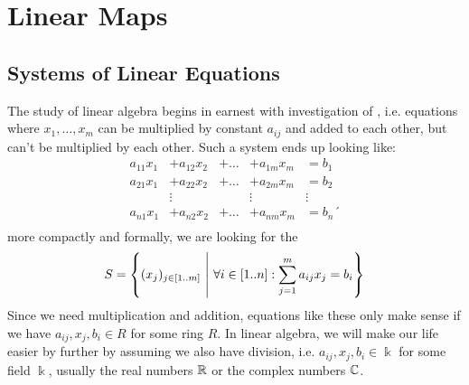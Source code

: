 \chapter{Linear Maps}
\section{Systems of Linear Equations}
The study of linear algebra begins in earnest with investigation of , i.e. equations where  $x_1, \hdots, x_m$ can be multiplied by constant  $a_{ij}$ and added to each other, but can't be multiplied by each other. Such a system ends up looking like:
\begin{align*}
	a_{11} x_1 &+ a_{12}x_2 &+ \hdots &+ a_{1m}x_m &= b_1\\
	a_{21} x_1 &+ a_{22}x_2 &+ \hdots &+ a_{2m}x_m &= b_2\\
	& \vdots & & \vdots & \vdots\\
	a_{n1} x_1 &+ a_{n2}x_2 &+ \hdots &+ a_{nm}x_m &= b_n´\\
\end{align*}
more compactly and formally, we are looking for the 
\begin{align*}
	S = \qty{(x_j)_{j \in [1..m]} ~\middle|~\forall i \in [1..n] : \sum_{j = 1}^m a_{ij} x_j = b_i}
\end{align*}
Since we need multiplication and addition, equations like these only make sense if we have $a_{ij}, x_j, b_i \in R$ for some ring $R$. In linear algebra, we will make our life easier by further by assuming we also have division, i.e. $a_{ij}, x_j, b_i \in \Bbbk$ for some field $\Bbbk$, usually the real numbers $\mathbb{R}$ or the complex numbers $\mathbb{C}$.
